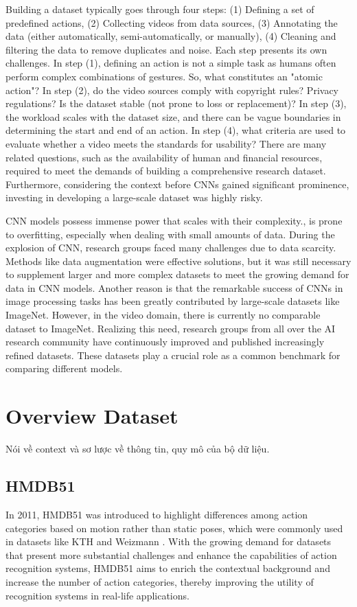 \documentclass[a4paper]{article}
\begin{document}
Building a dataset typically goes through four steps: (1) Defining a set of
predefined actions, (2) Collecting videos from data sources, (3) Annotating the
data (either automatically, semi-automatically, or manually), (4) Cleaning and
filtering the data to remove duplicates and noise. Each step presents its own
challenges. In step (1), defining an action is not a simple task as humans often
perform complex combinations of gestures. So, what constitutes an "atomic
action"? In step (2), do the video sources comply with copyright rules? Privacy
regulations? Is the dataset stable (not prone to loss or replacement)? In step
(3), the workload scales with the dataset size, and there can be vague
boundaries in determining the start and end of an action. In step (4), what
criteria are used to evaluate whether a video meets the standards for usability?
There are many related questions, such as the availability of human and
financial resources, required to meet the demands of building a comprehensive
research dataset. Furthermore, considering the context before CNNs gained
significant prominence, investing in developing a large-scale dataset was highly
risky.

CNN models possess immense power that scales with their complexity., is prone to
overfitting, especially when dealing with small amounts of data. During the
explosion of CNN, research groups faced many challenges due to data scarcity.
Methods like data augmentation were effective solutions, but it was still
necessary to supplement larger and more complex datasets to meet the growing
demand for data in CNN models. Another reason is that the remarkable success of
CNNs in image processing tasks has been greatly contributed by large-scale
datasets like ImageNet. However, in the video domain, there is currently no
comparable dataset to ImageNet. Realizing this need, research groups from all
over the AI research community have continuously improved and published
increasingly refined datasets. These datasets play a crucial role as a common
benchmark for comparing different models.
\section{Overview Dataset}
Nói về context và sơ lược về thông tin, quy mô của bộ dữ liệu.
\subsection{HMDB51}
In 2011, HMDB51 \cite{HMDB51} was introduced to highlight differences among action categories based on motion rather than static poses, which were commonly used in datasets like KTH \cite{KTH} and Weizmann \cite{Weizmann}. With the growing demand for datasets that present more substantial challenges and enhance the capabilities of action recognition systems, HMDB51 aims to enrich the contextual background and increase the number of action categories, thereby improving the utility of recognition systems in real-life applications.
\end{document}
